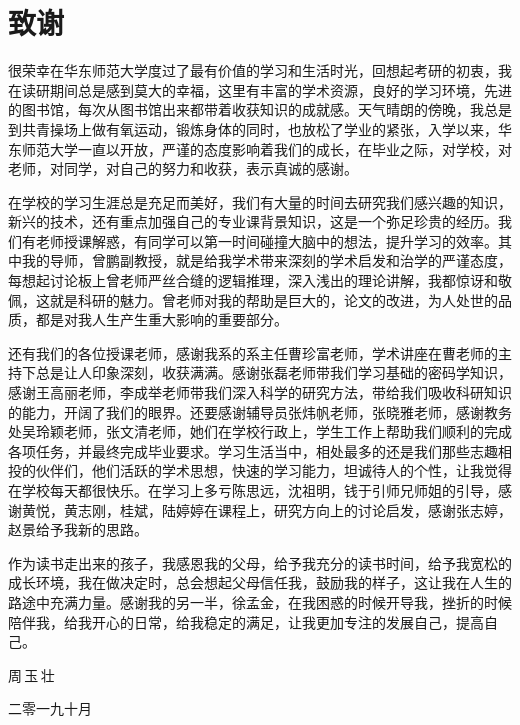 {\kaishu
\chapter*{致\qquad 谢}
很荣幸在华东师范大学度过了最有价值的学习和生活时光，回想起考研的初衷，我在读研期间总是感到莫大的幸福，这里有丰富的学术资源，良好的学习环境，先进的图书馆，每次从图书馆出来都带着收获知识的成就感。天气晴朗的傍晚，我总是到共青操场上做有氧运动，锻炼身体的同时，也放松了学业的紧张，入学以来，华东师范大学一直以开放，严谨的态度影响着我们的成长，在毕业之际，对学校，对老师，对同学，对自己的努力和收获，表示真诚的感谢。

在学校的学习生涯总是充足而美好，我们有大量的时间去研究我们感兴趣的知识，新兴的技术，还有重点加强自己的专业课背景知识，这是一个弥足珍贵的经历。我们有老师授课解惑，有同学可以第一时间碰撞大脑中的想法，提升学习的效率。其中我的导师，曾鹏副教授，就是给我学术带来深刻的学术启发和治学的严谨态度，每想起讨论板上曾老师严丝合缝的逻辑推理，深入浅出的理论讲解，我都惊讶和敬佩，这就是科研的魅力。曾老师对我的帮助是巨大的，论文的改进，为人处世的品质，都是对我人生产生重大影响的重要部分。

还有我们的各位授课老师，感谢我系的系主任曹珍富老师，学术讲座在曹老师的主持下总是让人印象深刻，收获满满。感谢张磊老师带我们学习基础的密码学知识，感谢王高丽老师，李成举老师带我们深入科学的研究方法，带给我们吸收科研知识的能力，开阔了我们的眼界。还要感谢辅导员张炜帆老师，张晓雅老师，感谢教务处吴玲颖老师，张文清老师，她们在学校行政上，学生工作上帮助我们顺利的完成各项任务，并最终完成毕业要求。学习生活当中，相处最多的还是我们那些志趣相投的伙伴们，他们活跃的学术思想，快速的学习能力，坦诚待人的个性，让我觉得在学校每天都很快乐。在学习上多亏陈思远，沈祖明，钱于引师兄师姐的引导，感谢黄悦，黄志刚，桂斌，陆婷婷在课程上，研究方向上的讨论启发，感谢张志婷，赵景给予我新的思路。

作为读书走出来的孩子，我感恩我的父母，给予我充分的读书时间，给予我宽松的成长环境，我在做决定时，总会想起父母信任我，鼓励我的样子，这让我在人生的路途中充满力量。感谢我的另一半，徐孟金，在我困惑的时候开导我，挫折的时候陪伴我，给我开心的日常，给我稳定的满足，让我更加专注的发展自己，提高自己。

\vspace{0.8cm} \hspace{9.8cm}  周\,玉\,壮

\hspace{9cm}  二零一九十月 }
